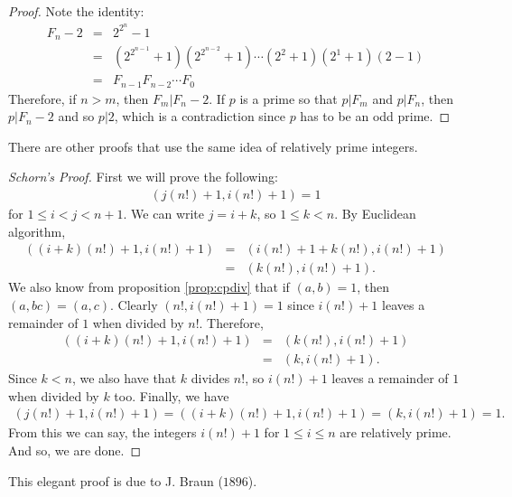 \documentclass{subfiles}
\begin{document}
		\begin{proof}
			Note the identity:
			\begin{eqnarray*}
				F_n-2 & = & 2^{2^n}-1\\
					  & = & \left(2^{2^{n-1}}+1\right)\left(2^{2^{n-2}}+1\right)\cdots\left(2^2+1\right)(2^1+1)(2-1)\\
					  & = & F_{n-1}F_{n-2}\cdots F_{0}
			\end{eqnarray*}
			Therefore, if $n>m$, then $F_m|F_n-2$. If $p$ is a prime so that $p|F_m$ and $p|F_n$, then $p|F_n-2$ and so $p|2$, which is a contradiction since $p$ has to be an odd prime.
		\end{proof}
	There are other proofs that use the same idea of relatively prime integers.
		\begin{proof}[Schorn's Proof]
			First we will prove the following:
				\begin{align*}
					(j(n!)+1,i(n!)+1)=1
				\end{align*}
			for $1\leq i<j<n+1$. We can write $j=i+k$, so $1\leq k<n$. By Euclidean algorithm,
				\begin{eqnarray*}
					((i+k)(n!)+1,i(n!)+1) & = & (i(n!)+1+k(n!),i(n!)+1)\\
										  & = & (k(n!),i(n!)+1).
				\end{eqnarray*}
			We also know from proposition \eqref{prop:cpdiv} that if $(a,b)=1$, then $(a,bc)=(a,c)$. Clearly $(n!,i(n!)+1)=1$ since $i(n!)+1$ leaves a remainder of $1$ when divided by $n!$. Therefore,
				\begin{eqnarray*}
					((i+k)(n!)+1,i(n!)+1) & = & (k(n!),i(n!)+1)\\
										  & = & (k,i(n!)+1).
				\end{eqnarray*}
			Since $k<n$, we also have that $k$ divides $n!$, so $i(n!)+1$ leaves a remainder of $1$ when divided by $k$ too. Finally, we have
				\begin{eqnarray*}
					(j(n!)+1,i(n!)+1) = ((i+k)(n!)+1,i(n!)+1) = (k,i(n!)+1) = 1.
				\end{eqnarray*}
			From this we can say, the integers $i(n!)+1$ for $1\leq i\leq n$ are relatively prime. And so, we are done.
		\end{proof}
	This elegant proof is due to J. Braun ($1896$).
\end{document}
